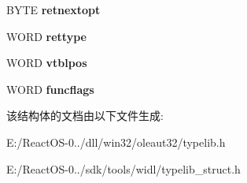 \begin{DoxyCompactItemize}
\item 
\mbox{\label{struct_s_l_t_g___function_afb8945fef95d7a8416ab6ab8a01193a9}} 
B\+Y\+TE {\bfseries retnextopt}
\item 
\mbox{\label{struct_s_l_t_g___function_a1deabafccca77c80a856bc7106307e09}} 
W\+O\+RD {\bfseries rettype}
\item 
\mbox{\label{struct_s_l_t_g___function_a6f2694120541c1ff5d27d492f607aab5}} 
W\+O\+RD {\bfseries vtblpos}
\item 
\mbox{\label{struct_s_l_t_g___function_a82bf39a625226b222f13b2cc82b5bac2}} 
W\+O\+RD {\bfseries funcflags}
\end{DoxyCompactItemize}


该结构体的文档由以下文件生成\+:\begin{DoxyCompactItemize}
\item 
E\+:/\+React\+O\+S-\/0../dll/win32/oleaut32/typelib.\+h\item 
E\+:/\+React\+O\+S-\/0../sdk/tools/widl/typelib\+\_\+struct.\+h\end{DoxyCompactItemize}
